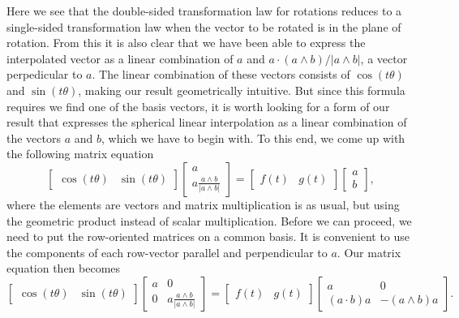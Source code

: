 \documentclass{article}
\begin{document}
Here we see that the double-sided transformation law for rotations
reduces to a single-sided transformation law when the vector to
be rotated is in the plane of rotation.  From this it is also clear
that we have been able to express the interpolated vector as
a linear combination of $a$ and $a\cdot(a\wedge b)/|a\wedge b|$,
a vector perpedicular to $a$.  The linear combination of
these vectors consists of $\cos(t\theta)$ and $\sin(t\theta)$,
making our result geometrically intuitive.  But since this formula requires
we find one of the basis vectors, it is worth looking for a form
of our result that expresses the spherical linear interpolation
as a linear combination of the vectors $a$ and $b$, which we have
to begin with.
To this end, we come up with the following matrix equation
\begin{equation*}
\left[\begin{array}{cc}\cos(t\theta)&\sin(t\theta)\end{array}\right]
\left[\begin{array}{c}a\\a\frac{a\wedge b}{|a\wedge b|}\end{array}\right]
=\left[\begin{array}{cc}f(t)&g(t)\end{array}\right]
\left[\begin{array}{c}a\\b\end{array}\right],
\end{equation*}
where the elements are vectors and matrix multiplication
is as usual, but using the geometric product instead of scalar multiplication.
Before we can proceed, we need to put the row-oriented matrices on a common basis.
It is convenient to use the components of each row-vector
parallel and perpendicular to $a$.  Our matrix equation then becomes
\begin{equation*}
\left[\begin{array}{cc}\cos(t\theta)&\sin(t\theta)\end{array}\right]
\left[\begin{array}{cc}a&0\\0&a\frac{a\wedge b}{|a\wedge b|}\end{array}\right]
=\left[\begin{array}{cc}f(t)&g(t)\end{array}\right]
\left[\begin{array}{cc}a&0\\(a\cdot b)a&-(a\wedge b)a\end{array}\right].
\end{equation*}
\end{document}
